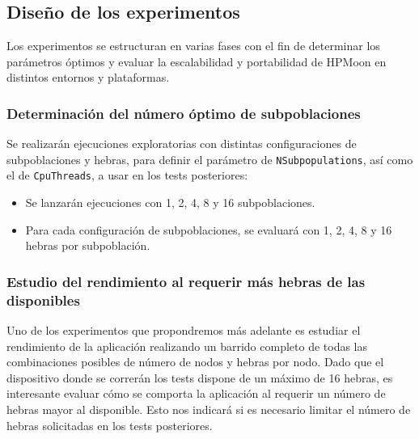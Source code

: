 \subsection{Diseño de los experimentos}\label{subsec:diseno_experimentos_detallado}

Los experimentos se estructuran en varias fases con el fin de determinar los parámetros óptimos y evaluar la escalabilidad y portabilidad de HPMoon en distintos entornos y plataformas.

\subsubsection{Determinación del número óptimo de subpoblaciones}\label{subsubsec:determinacion_subpoblaciones}

Se realizarán ejecuciones exploratorias con distintas configuraciones de subpoblaciones y hebras, para definir el parámetro de \texttt{NSubpopulations}, así como el de \texttt{CpuThreads}, a usar en los tests posteriores:

\begin{itemize}
    \item Se lanzarán ejecuciones con 1, 2, 4, 8 y 16 subpoblaciones.
    \item Para cada configuración de subpoblaciones, se evaluará con 1, 2, 4, 8 y 16 hebras por subpoblación.
\end{itemize}

\subsubsection{Estudio del rendimiento al requerir más hebras de las disponibles}

Uno de los experimentos que propondremos más adelante es estudiar el rendimiento de la aplicación realizando un barrido completo de todas las combinaciones posibles de número de nodos y hebras por nodo. Dado que el dispositivo donde se correrán los tests dispone de un máximo de 16 hebras, es interesante evaluar cómo se comporta la aplicación al requerir un número de hebras mayor al disponible. Esto nos indicará si es necesario limitar el número de hebras solicitadas en los tests posteriores.

